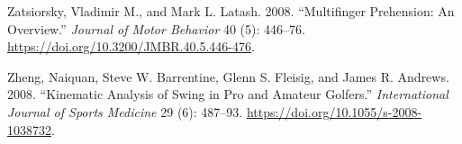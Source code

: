 \documentclass[
  letterpaper,
]{report}
\newlength{\cslhangindent}
\newenvironment{CSLReferences}[2] %
 {\begin{list}{}{%
  \setlength{\itemindent}{0pt}
  \setlength{\leftmargin}{0pt}
  \setlength{\parsep}{0pt}
  \ifodd #1
   \setlength{\leftmargin}{\cslhangindent}
   \setlength{\itemindent}{-1\cslhangindent}
  \fi
  \setlength{\itemsep}{#2\baselineskip}}}
 {\end{list}}
\begin{document}
\begin{CSLReferences}{1}{0}
Zatsiorsky, Vladimir M., and Mark L. Latash. 2008. {``Multifinger
Prehension: An Overview.''} \emph{Journal of Motor Behavior} 40 (5):
446--76. \url{https://doi.org/10.3200/JMBR.40.5.446-476}.

Zheng, Naiquan, Steve W. Barrentine, Glenn S. Fleisig, and James R.
Andrews. 2008. {``Kinematic Analysis of Swing in Pro and Amateur
Golfers.''} \emph{International Journal of Sports Medicine} 29 (6):
487--93. \url{https://doi.org/10.1055/s-2008-1038732}.

\end{CSLReferences}
\end{document}
